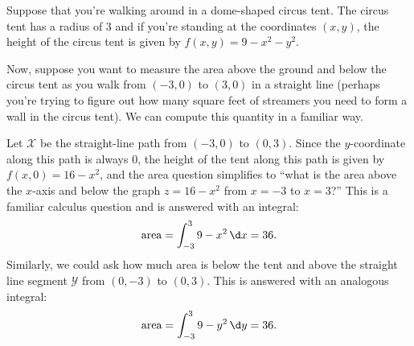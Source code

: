 Suppose that you're walking around in a dome-shaped circus tent.  The circus
tent has a radius of $3$ and if
you're standing at the coordinates $(x,y)$, the height of the circus
tent is given by $f(x,y) = 9-x^2-y^2$.

	\begin{center}
	\end{center}

Now, suppose you want to measure the area above the ground
and below the circus tent as you walk from $(-3,0)$ to
$(3,0)$ in a straight line (perhaps you're trying to figure
out how many square feet of streamers you need to form a wall in
the circus tent).  We can compute this quantity in a familiar way.

\begin{center}
\end{center}

Let $\mathcal X$ be the straight-line path from $(-3,0)$ to $(0,3)$.
Since the $y$-coordinate along this path is always $0$,
the height of the tent along this path is given by $f(x,0) = 16-x^2$,
and the area question simplifies to ``what is the area above the $x$-axis
and below the graph $z=16-x^2$ from $x=-3$ to $x=3$?''  This is a familiar
calculus question and is answered with an integral:
\[
	\text{area} = \int_{-3}^3 9-x^2\,\d x = 36.
\]
Similarly, we could ask how much area is below the tent and above the straight
line segment $\mathcal Y$ from $(0,-3)$ to $(0,3)$.  This is answered with an 
analogous integral:
\[
	\text{area} = \int_{-3}^3 9-y^2\,\d y = 36.
\]

